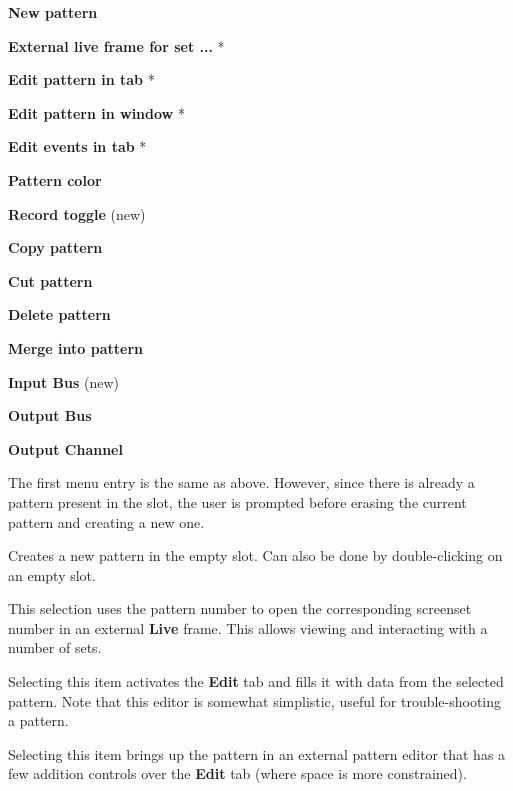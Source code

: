    \begin{enumber}
      \item \textbf{New pattern}
      \item \textbf{External live frame for set ...} *
      \item \textbf{Edit pattern in tab} *
      \item \textbf{Edit pattern in window} *
      \item \textbf{Edit events in tab} *
      \item \textbf{Pattern color}
      \item \textbf{Record toggle} (new)
      \item \textbf{Copy pattern}
      \item \textbf{Cut pattern}
      \item \textbf{Delete pattern}
      \item \textbf{Merge into pattern}
      \item \textbf{Input Bus} (new)
      \item \textbf{Output Bus}
      \item \textbf{Output Channel}
   \end{enumber}

   The first menu entry is the same as above.  However, since there is
   already a pattern present in the slot, the user is prompted before erasing
   the current pattern and creating a new one.

   \setcounter{ItemCounter}{0}      %

   Creates a new pattern in the empty slot.
   Can also be done by double-clicking on an empty slot.

   This selection uses the pattern number to open the corresponding screenset
   number in an external \textbf{Live} frame.
   This allows viewing and interacting with a number of sets.

   Selecting this item activates the \textbf{Edit} tab and fills it with data
   from the selected pattern.
   Note that this editor is somewhat simplistic, useful for trouble-shooting a
   pattern.

   Selecting this item brings up the pattern in an external pattern editor that
   has a few addition controls over the \textbf{Edit} tab (where space is more
   constrained).

